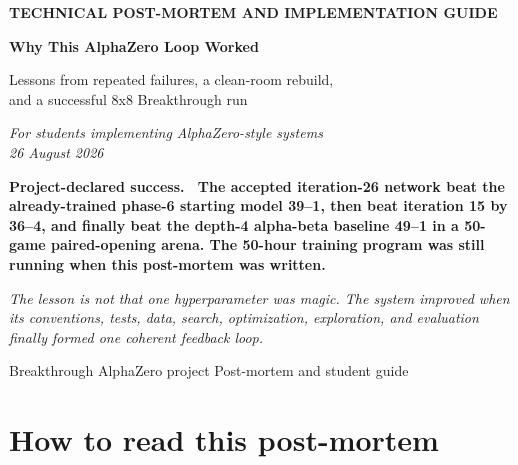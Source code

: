 \documentclass[10.5pt,letterpaper]{article}
\newcommand{\boxtitle}[1]{\sffamily\bfseries\color{deepblue}#1.\ }
\begin{document}
\begin{titlepage}
\thispagestyle{empty}
\vspace*{0.65in}
{\sffamily\bfseries\color{gold}\large TECHNICAL POST-MORTEM AND IMPLEMENTATION GUIDE}
\vspace{0.55in}

{\sffamily\bfseries\color{navy}\fontsize{31}{35}\selectfont
Why This AlphaZero Loop Worked\par}
\vspace{0.25in}

{\sffamily\color{deepblue}\fontsize{17}{22}\selectfont
Lessons from repeated failures, a clean-room rebuild,\\
and a successful 8x8 Breakthrough run\par}
\vspace{0.28in}

{\large\itshape\color{muted}
For students implementing AlphaZero-style systems\\
26 August 2026\par}

\vfill
\begin{keybox}
\boxtitle{Project-declared success}
The accepted iteration-26 network beat the already-trained phase-6 starting
model 39--1, then beat iteration 15 by 36--4, and finally beat the depth-4
alpha-beta baseline 49--1 in a 50-game paired-opening arena. The 50-hour
training program was still running when this post-mortem was written.
\end{keybox}
\vspace{0.2in}

\begin{center}
\large\itshape
The lesson is not that one hyperparameter was magic. The system improved when
its conventions, tests, data, search, optimization, exploration, and evaluation
finally formed one coherent feedback loop.
\end{center}

\vfill
{\sffamily\footnotesize\color{muted}
Breakthrough AlphaZero project \hfill Post-mortem and student guide}
\end{titlepage}

\setcounter{tocdepth}{1}
\tableofcontents
\clearpage

\section*{How to read this post-mortem}
\end{document}
